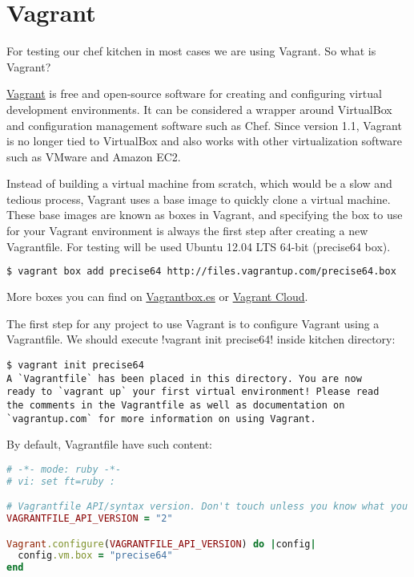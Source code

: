 \section{Vagrant}
\label{sec:solo-vagrant}

For testing our chef kitchen in most cases we are using Vagrant. So what is Vagrant?

\href{http://www.vagrantup.com/}{Vagrant} is free and open-source software for creating and configuring virtual development environments. It can be considered a wrapper around VirtualBox and configuration management software such as Chef. Since version 1.1, Vagrant is no longer tied to VirtualBox and also works with other virtualization software such as VMware and Amazon EC2.

Instead of building a virtual machine from scratch, which would be a slow and tedious process, Vagrant uses a base image to quickly clone a virtual machine. These base images are known as boxes in Vagrant, and specifying the box to use for your Vagrant environment is always the first step after creating a new Vagrantfile. For testing will be used Ubuntu 12.04 LTS 64-bit (precise64 box).

\begin{lstlisting}[language=Bash,label=lst:my-cloud-vagrant1]
$ vagrant box add precise64 http://files.vagrantup.com/precise64.box
\end{lstlisting}

More boxes you can find on \href{http://www.vagrantbox.es/}{Vagrantbox.es} or \href{https://vagrantcloud.com/}{Vagrant Cloud}.

The first step for any project to use Vagrant is to configure Vagrant using a Vagrantfile. We should execute \inline!vagrant init precise64! inside kitchen directory:

\begin{lstlisting}[label=lst:my-cloud-vagrant2]
$ vagrant init precise64
A `Vagrantfile` has been placed in this directory. You are now
ready to `vagrant up` your first virtual environment! Please read
the comments in the Vagrantfile as well as documentation on
`vagrantup.com` for more information on using Vagrant.
\end{lstlisting}

By default, Vagrantfile have such content:

\begin{lstlisting}[language=Ruby,label=lst:my-cloud-vagrant3,title=my-cloud/nodes/Vagrantfile]
# -*- mode: ruby -*-
# vi: set ft=ruby :

# Vagrantfile API/syntax version. Don't touch unless you know what you're doing!
VAGRANTFILE_API_VERSION = "2"

Vagrant.configure(VAGRANTFILE_API_VERSION) do |config|
  config.vm.box = "precise64"
end
\end{lstlisting}

